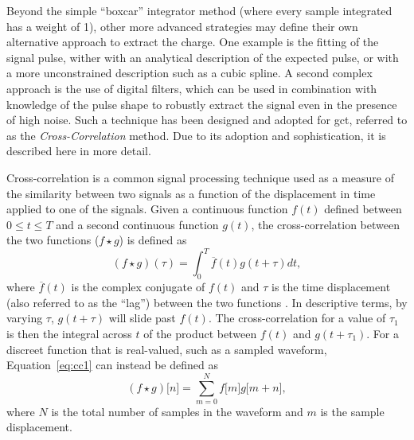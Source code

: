Beyond the simple ``boxcar'' integrator method (where every sample integrated has a weight of 1), other more advanced strategies may define their own alternative approach to extract the charge. One example is the fitting of the signal pulse, wither with an analytical description of the expected pulse, or with a more unconstrained description such as a cubic spline. A second complex approach is the use of digital filters, which can be used in combination with knowledge of the pulse shape to robustly extract the signal even in the presence of high noise. Such a technique has been designed and adopted for \gls{gct}, referred to as the \textit{Cross-Correlation} method. Due to its adoption and sophistication, it is described here in more detail. 

Cross-correlation is a common signal processing technique used as a measure of the similarity between two signals as a function of the displacement in time applied to one of the signals. Given a continuous function $f(t)$ defined between $0 \le t \le T$ and a second continuous function $g(t)$, the cross-correlation between the two functions ($f \star g$) is defined as 
\begin{equation} \label{eq:cc1}
(f \star g)(\tau) = \int_0^T \overline{f}(t)g(t + \tau)dt,
\end{equation}
where $\overline{f}(t)$ is the complex conjugate of $f(t)$ and $\tau$ is the time displacement (also referred to as the ``lag'') between the two functions \cite{wolfram-crosscorrelate}. In descriptive terms, by varying $\tau$, $g(t + \tau)$ will slide past $f(t)$. The cross-correlation for a value of $\tau_1$ is then the integral across $t$ of the product between $f(t)$ and $g(t + \tau_1)$. For a discreet function that is real-valued, such as a sampled waveform, Equation~\ref{eq:cc1} can instead be defined as
\begin{equation} \label{eq:cc2}
(f \star g)\lbrack n \rbrack = \sum_{m=0}^N f\lbrack m \rbrack g\lbrack m + n\rbrack,
\end{equation}
where $N$ is the total number of samples in the waveform and $m$ is the sample displacement. 

